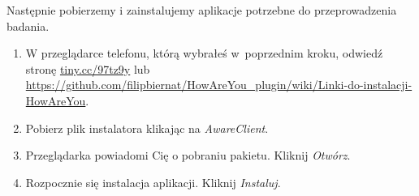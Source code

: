 Następnie pobierzemy i zainstalujemy aplikacje potrzebne do przeprowadzenia badania.

\begin{enumerate}
	
	\item W przeglądarce telefonu, którą wybrałeś w~poprzednim kroku, odwiedź stronę \url{tiny.cc/97tz9y} lub \url{https://github.com/filipbiernat/HowAreYou_plugin/wiki/Linki-do-instalacji-HowAreYou}.
	
	\item Pobierz plik instalatora klikając na \textit{AwareClient}.
	
	\item Przeglądarka powiadomi Cię o pobraniu pakietu. Kliknij \textit{Otwórz}. 
	
	\item Rozpocznie się instalacja aplikacji. Kliknij \textit{Instaluj}.
	

\end{enumerate}
